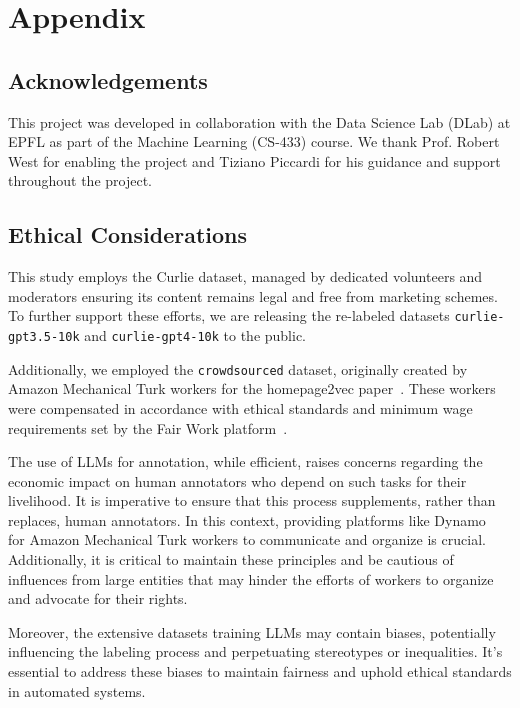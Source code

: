 \section{Appendix}

\subsection{Acknowledgements}\label{appendix:acknowledgements}

This project was developed in collaboration with the Data Science Lab (DLab) at EPFL as part of the Machine Learning (CS-433) course. We thank Prof. Robert West for enabling the project and Tiziano Piccardi for his guidance and support throughout the project.

\subsection{Ethical Considerations}\label{appendix:ethical-considerations}

This study employs the Curlie dataset, managed by dedicated volunteers and moderators ensuring its content remains legal and free from marketing schemes. To further support these efforts, we are releasing the re-labeled datasets \texttt{curlie-gpt3.5-10k} and \texttt{curlie-gpt4-10k} to the public.

Additionally, we employed the \texttt{crowdsourced} dataset, originally created by Amazon Mechanical Turk workers for the homepage2vec paper~\cite{homepage2vec}. 
These workers were compensated in accordance with ethical standards and minimum wage requirements set by the Fair Work platform~\cite{ethics2}.

The use of LLMs for annotation, while efficient, raises concerns regarding the economic impact on human annotators who depend on such tasks for their livelihood. 
It is imperative to ensure that this process supplements, rather than replaces, human annotators. In this context, providing platforms like Dynamo~\cite{ethics1} for Amazon Mechanical Turk workers to communicate and organize is crucial. Additionally, it is critical to maintain these principles and be cautious of influences from large entities that may hinder the efforts of workers to organize and advocate for their rights.

Moreover, the extensive datasets training LLMs may contain biases, potentially influencing the labeling process and perpetuating stereotypes or inequalities. 
It's essential to address these biases to maintain fairness and uphold ethical standards in automated systems.


